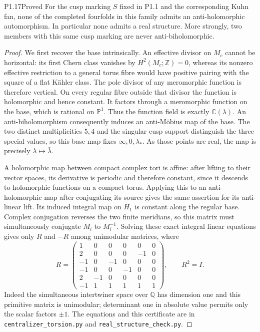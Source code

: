 \begin{statement}{P1.17}{Proved}
For the cusp marking $S$ fixed in P1.1 and the corresponding Kuhn fan,
none of the completed fourfolds in this family admits an
anti-holomorphic automorphism.  In particular none admits a real
structure.  More strongly, two members with this same cusp marking
are never anti-biholomorphic.
\end{statement}
\begin{proof}
We first recover the base intrinsically.  An effective divisor on
$M_c$ cannot be horizontal: its first Chern class vanishes by
$H^2(M_c;\mathbb Z)=0$, whereas its nonzero effective restriction to a
general torus fibre would have positive pairing with the square of a
flat K\"ahler class.  The pole divisor of any meromorphic function is
therefore vertical.  On every regular fibre outside that divisor the
function is holomorphic and hence constant.  It factors through a
meromorphic function on the base, which is rational on
$\mathbb P^1$.  Thus the function field is exactly $\mathbb C(\lambda)$.
An anti-biholomorphism consequently induces an anti-M\"obius map of
the base.  The two distinct multiplicities $5,4$ and the singular cusp
support distinguish the three special values, so this base map fixes
$\infty,0,\lambda_*$.  As those points are real, the map is precisely
$\lambda\mapsto\bar\lambda$.

A holomorphic map between compact complex tori is affine: after
lifting to their vector spaces, its derivative is periodic and
therefore constant, since it descends to holomorphic functions on a
compact torus.  Applying this to an anti-holomorphic map after
conjugating its source gives the same assertion for its anti-linear
lift.  Its induced integral map on $H_1$ is constant along the
regular base.  Complex conjugation reverses the two finite meridians,
so this matrix must simultaneously conjugate $M_i$ to $M_i^{-1}$.
Solving these exact integral linear equations gives only $R$ and
$-R$ among unimodular matrices, where
\[
R=\begin{pmatrix}
1&0&0&0&0&0\\
2&0&0&0&-1&0\\
-1&0&-1&0&0&0\\
-1&0&0&-1&0&0\\
2&-1&0&0&0&0\\
-1&1&1&1&1&1
\end{pmatrix},\qquad R^2=I.
\]
Indeed the simultaneous intertwiner space over $\mathbb Q$ has
dimension one and this primitive matrix is unimodular; determinant
one in absolute value permits only the scalar factors $\pm1$.
The equations and this certificate are in
\texttt{centralizer\_torsion.py} and
\texttt{real\_structure\_check.py}.


\end{proof}
